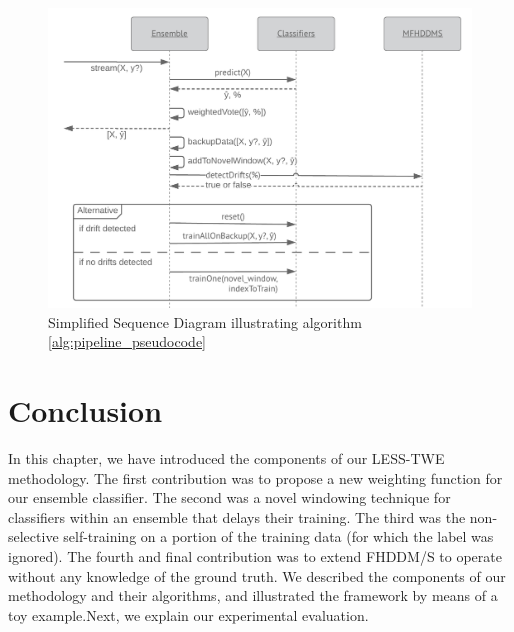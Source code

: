 \begin{figure}
  \includegraphics[width=\linewidth]{./images/chapter3/sequence_diagram}
\caption{\label{fig:sequence_diagram}Simplified Sequence Diagram illustrating algorithm \ref{alg:pipeline_pseudocode}}
\end{figure}


\section{Conclusion}
In this chapter, we have introduced the components of our LESS-TWE methodology. The first contribution was to propose a new weighting function for our ensemble classifier. The second was a novel windowing technique for classifiers within an ensemble that delays their training. The third was the non-selective self-training on a portion of the training data (for which the label was ignored). The fourth and final contribution was to extend FHDDM/S to operate without any knowledge of the ground truth. We described the components of our methodology and their algorithms, and illustrated the framework by means of a toy example.Next, we explain our experimental evaluation.